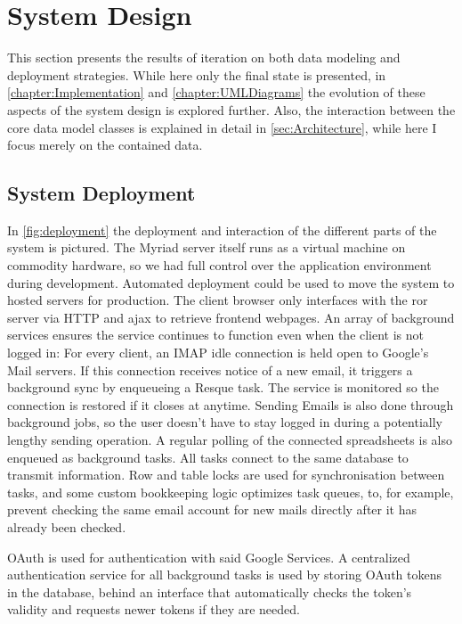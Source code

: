 \section{System Design}

This section presents the results of iteration on both data modeling and deployment strategies. While here only the final state is presented, in \autoref{chapter:Implementation} and \autoref{chapter:UMLDiagrams} the evolution of these aspects of the system design is explored further. Also, the interaction between the core data model classes is explained in detail in \autoref{sec:Architecture}, while here I focus merely on the contained data.


\subsection{System Deployment}

In \autoref{fig:deployment} the deployment and interaction of the different parts of the system is pictured. The Myriad server itself runs as a virtual machine on commodity hardware, so we had full control over the application environment during development. Automated deployment could be used to move the system to hosted servers for production. The client browser only interfaces with the \acrlong{ror} server via HTTP and \gls{ajax} to retrieve frontend webpages. An array of background services ensures the service continues to function even when the client is not logged in: For every client, an IMAP idle connection is held open to Google's Mail servers. If this connection receives notice of a new email, it triggers a background sync by enqueueing a Resque task. The service is monitored so the connection is restored if it closes at anytime.
Sending Emails is also done through background jobs, so the user doesn't have to stay logged in during a potentially lengthy sending operation. A regular polling of the connected spreadsheets is also enqueued as background tasks. All tasks connect to the same database to transmit information. Row and table locks are used for synchronisation between tasks, and some custom bookkeeping logic optimizes task queues, to, for example, prevent checking the same email account for new mails directly after it has already been checked.

OAuth is used for authentication with said Google Services. A centralized authentication service for all background tasks is used by storing OAuth tokens in the database, behind an interface that automatically checks the token's validity and requests newer tokens if they are needed.


